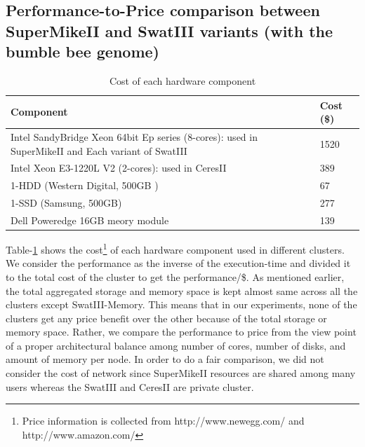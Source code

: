 \documentclass[conference]{IEEEtran}
\begin{document}
\subsection {Performance-to-Price comparison between SuperMikeII and SwatIII variants (with the bumble bee genome)} \label{PriceToPerformanceBumbleBee}
\begin{table}
	\begin{tabular}{ |p{5cm} | p{2.6cm} |} \hline
		Component & Cost (\$)\\ \hline
		Intel SandyBridge Xeon 64bit Ep series (8-cores): used in SuperMikeII and Each variant of SwatIII & 1520\\ \hline
		Intel Xeon E3-1220L V2 (2-cores): used in CeresII & 389\\ \hline
		1-HDD (Western Digital, 500GB ) & 67\\ \hline
		1-SSD (Samsung, 500GB) & 277\\ \hline
		Dell Poweredge 16GB meory module & 139\\ \hline
	\end{tabular}
	\caption{Cost of each hardware component}
	\label{table:PriceOfEachComponent}
\end{table}
Table-\ref{table:PriceOfEachComponent} shows the cost\footnote{Price information is collected from http://www.newegg.com/ and http://www.amazon.com/} of each hardware component used in different clusters.
We consider the performance as the inverse of the execution-time and divided it to the total cost of the cluster to get the performance/\$.
As mentioned earlier, the total aggregated storage and memory space is kept almost same across all the clusters except SwatIII-Memory.
This means that in our experiments, none of the clusters get any price benefit over the other because of the total storage or memory space.   
Rather, we compare the performance to price from the view point of a proper architectural balance among number of cores, number of disks, and amount of memory per node.
In order to do a fair comparison, we did not consider the cost of network since SuperMikeII resources are shared among many users whereas the SwatIII and CeresII are private cluster.
\end{document}
